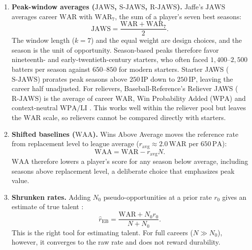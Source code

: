 \documentclass[11pt,letterpaper]{article}
\theoremstyle{plain}
\theoremstyle{definition}
\theoremstyle{remark}
\newcommand{\WAR}{\mathrm{WAR}}
\newcommand{\WAA}{\mathrm{WAA}}
\newcommand{\PA}{\mathrm{PA}}
\newcommand{\IP}{\mathrm{IP}}
\newcommand{\JAWS}{\mathrm{JAWS}}
\newcommand{\SJAWS}{\mathrm{S\text{-}JAWS}}
\newcommand{\RJAWS}{\mathrm{R\text{-}JAWS}}
\begin{document}
\begin{enumerate}
    \item \textbf{Peak-window averages ($\JAWS$, $\SJAWS$, $\RJAWS$).} Jaffe's $\JAWS$ \cite{jaffe2004,jaffe2017} averages career $\WAR$ with $\WAR_7$, the sum of a player's seven best seasons:
    \begin{equation}
        \JAWS = \frac{\WAR + \WAR_7}{2}.
    \end{equation}
    The window length ($k=7$) and the equal weight are design choices, and the season is the unit of opportunity. Season-based peaks therefore favor nineteenth- and early-twentieth-century starters, who often faced $1{,}400$--$2{,}500$ batters per season against $650$--$850$ for modern starters. Starter JAWS ($\SJAWS$) \cite{jaffe2022} prorates peak seasons above $250\,\IP$ down to $250\,\IP$, leaving the career half unadjusted. For relievers, Baseball-Reference's Reliever JAWS ($\RJAWS$) is the average of career $\WAR$, Win Probability Added ($\mathrm{WPA}$) and context-neutral $\mathrm{WPA/LI}$ \cite{bbrefjawsrp}. This works well within the reliever pool but leaves the $\WAR$ scale, so relievers cannot be compared directly with starters.

    \item \textbf{Shifted baselines ($\WAA$).} Wins Above Average moves the reference rate from replacement level to league average ($r_{\mathrm{avg}} \approx 2.0\,\WAR$ per $650\,\PA$):
    \begin{equation}
        \WAA = \WAR - r_{\mathrm{avg}} N.
    \end{equation}
    $\WAA$ therefore lowers a player's score for any season below average, including seasons above replacement level, a deliberate choice that emphasizes peak value.

    \item \textbf{Shrunken rates.} Adding $N_0$ pseudo-opportunities at a prior rate $r_0$ gives an estimate of true talent \cite{efron1975,tango2007,albert2020}:
    \begin{equation}
        \hat{r}_{\mathrm{EB}} = \frac{\WAR + N_0 r_0}{N + N_0}.
    \end{equation}
    This is the right tool for estimating talent. For full careers ($N \gg N_0$), however, it converges to the raw rate and does not reward durability.
\end{enumerate}
\end{document}
